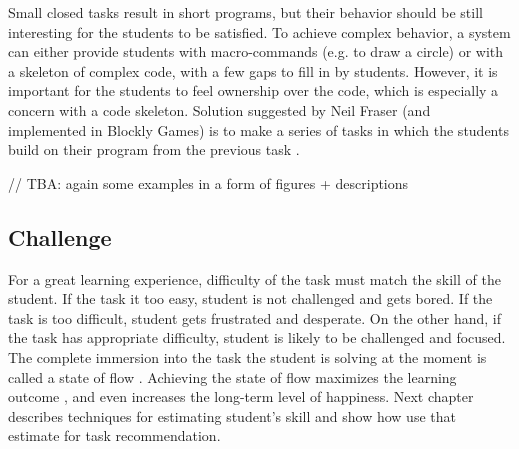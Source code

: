 Small closed tasks result in short programs,
  but their behavior should be still interesting for the students to be satisfied.
To achieve complex behavior,
  a system can either provide students with macro-commands (e.g. to draw a circle)
  or with a skeleton of complex code, with a few gaps to fill in by students.
However, it is important for the students to feel ownership over the code,
  which is especially a concern with a code skeleton.
Solution suggested by Neil Fraser (and implemented in Blockly Games)
  is to make a series of tasks in which the students
  build on their program from the previous task
  \cite{blockly-10-things}.

// TBA: again some examples in a form of figures + descriptions



\subsection{Challenge}
\label{sec:motivation.challenge}
For a great learning experience,
  difficulty of the task must match the skill of the student.
If the task it too easy,
  student is not challenged and gets bored.
If the task is too difficult,
  student gets frustrated and desperate.
On the other hand, if the task has appropriate difficulty,
  student is likely to be challenged and focused.
The complete immersion into the task the student is solving at the moment is called
  a state of flow \cite{flow}.
Achieving the state of flow maximizes the learning outcome \cite{adaptive-practice},
  and even increases the long-term level of happiness. %
Next chapter describes techniques for estimating student’s skill
  and show how use that estimate for task recommendation.
